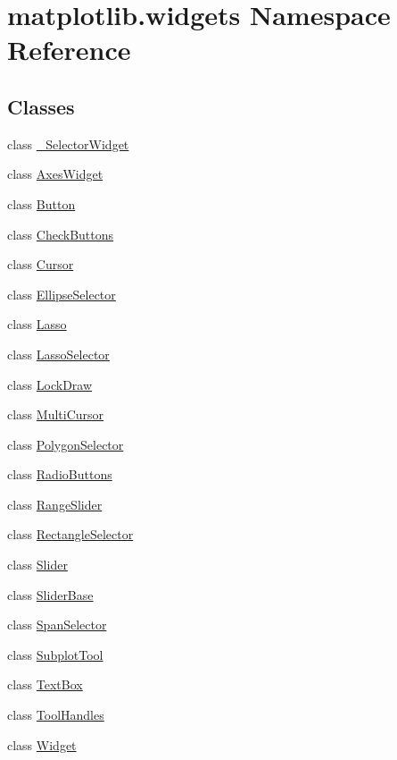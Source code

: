 \hypertarget{namespacematplotlib_1_1widgets}{}\section{matplotlib.\+widgets Namespace Reference}
\label{namespacematplotlib_1_1widgets}
\subsection*{Classes}
\begin{DoxyCompactItemize}
\item 
class \hyperlink{classmatplotlib_1_1widgets_1_1__SelectorWidget}{\+\_\+\+Selector\+Widget}
\item 
class \hyperlink{classmatplotlib_1_1widgets_1_1AxesWidget}{Axes\+Widget}
\item 
class \hyperlink{classmatplotlib_1_1widgets_1_1Button}{Button}
\item 
class \hyperlink{classmatplotlib_1_1widgets_1_1CheckButtons}{Check\+Buttons}
\item 
class \hyperlink{classmatplotlib_1_1widgets_1_1Cursor}{Cursor}
\item 
class \hyperlink{classmatplotlib_1_1widgets_1_1EllipseSelector}{Ellipse\+Selector}
\item 
class \hyperlink{classmatplotlib_1_1widgets_1_1Lasso}{Lasso}
\item 
class \hyperlink{classmatplotlib_1_1widgets_1_1LassoSelector}{Lasso\+Selector}
\item 
class \hyperlink{classmatplotlib_1_1widgets_1_1LockDraw}{Lock\+Draw}
\item 
class \hyperlink{classmatplotlib_1_1widgets_1_1MultiCursor}{Multi\+Cursor}
\item 
class \hyperlink{classmatplotlib_1_1widgets_1_1PolygonSelector}{Polygon\+Selector}
\item 
class \hyperlink{classmatplotlib_1_1widgets_1_1RadioButtons}{Radio\+Buttons}
\item 
class \hyperlink{classmatplotlib_1_1widgets_1_1RangeSlider}{Range\+Slider}
\item 
class \hyperlink{classmatplotlib_1_1widgets_1_1RectangleSelector}{Rectangle\+Selector}
\item 
class \hyperlink{classmatplotlib_1_1widgets_1_1Slider}{Slider}
\item 
class \hyperlink{classmatplotlib_1_1widgets_1_1SliderBase}{Slider\+Base}
\item 
class \hyperlink{classmatplotlib_1_1widgets_1_1SpanSelector}{Span\+Selector}
\item 
class \hyperlink{classmatplotlib_1_1widgets_1_1SubplotTool}{Subplot\+Tool}
\item 
class \hyperlink{classmatplotlib_1_1widgets_1_1TextBox}{Text\+Box}
\item 
class \hyperlink{classmatplotlib_1_1widgets_1_1ToolHandles}{Tool\+Handles}
\item 
class \hyperlink{classmatplotlib_1_1widgets_1_1Widget}{Widget}
\end{DoxyCompactItemize}



